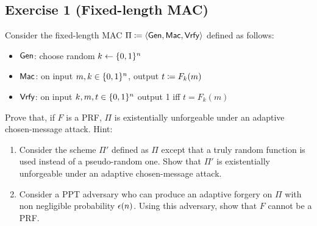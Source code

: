 \subsection{Exercise 1 (Fixed-length MAC)}

Consider the fixed-length MAC $\Pi \coloneqq \langle\operatorname{\mathsf{Gen}},\operatorname{\mathsf{Mac}},\operatorname{\mathsf{Vrfy}}\rangle$
defined as follows:
\begin{itemize}
  \item $\operatorname{\mathsf{Gen}}$: choose random $k\leftarrow \{0, 1\}^n$
  \item $\operatorname{\mathsf{Mac}}$: on input $m,k \in\{0, 1\}^n$, output $t \coloneqq F_k(m)$
  \item $\operatorname{\mathsf{Vrfy}}$: on input $k, m, t \in \{0, 1\}^n$ output 1 iff $t=F_k(m)$
\end{itemize}

Prove that, if $F$ is a PRF, $\Pi$ is existentially unforgeable under
an adaptive chosen-message attack. Hint:

\begin{enumerate}
  \item Consider the scheme $\Pi'$ defined as $\Pi$ except that a truly
        random function is used instead of a pseudo-random one. Show that
        $\Pi'$ is existentially unforgeable under an adaptive chosen-message
        attack.
  \item Consider a PPT adversary who can produce an adaptive forgery on
        $\Pi$ with non negligible probability $\epsilon(n)$. Using this
        adversary, show that $F$ cannot be a PRF.
\end{enumerate}


